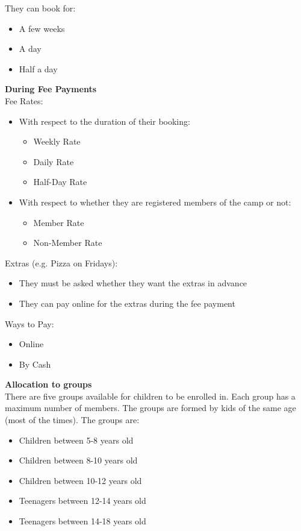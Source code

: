 \documentclass{l3proj}
\begin{document}
They can book for:
	\begin{itemize}
	\item A few weeks
	\item A day
	\item Half a day
	\end{itemize}
\textbf{During Fee Payments}\\
Fee Rates:
	\begin{itemize}
	\item With respect to the duration of their booking:
		\begin{itemize}
		\item Weekly Rate
		\item Daily Rate
		\item Half-Day Rate
		\end{itemize}
	\item With respect to whether they are registered members of the camp or not:
		\begin{itemize}
		\item Member Rate
		\item Non-Member Rate
		\end{itemize}
	\end{itemize}
Extras (e.g. Pizza on Fridays):
	\begin{itemize}
	\item They must be asked whether they want the extras in advance
	\item They can pay online for the extras during the fee payment
	\end{itemize}
Ways to Pay:
	\begin{itemize}
	\item Online
	\item By Cash
	\end{itemize}
\textbf{Allocation to groups}\\
There are five groups available for children to be enrolled in. Each group has a maximum number of members. The groups are formed by kids of the same age (most of the times). The groups are:
\begin{itemize}
	\item Children between 5-8 years old
	\item Children between 8-10 years old
	\item Children between 10-12 years old
	\item Teenagers between 12-14 years old
	\item Teenagers between 14-18 years old
\end{itemize}
\end{document}
